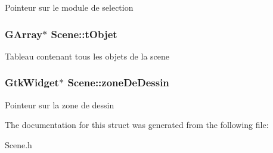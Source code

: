 \label{structScene_aeb68132316fb6167b13ec0fc6419e792}
Pointeur sur le module de selection \hypertarget{structScene_a7737f3a0d0e78060f899485d4d40b3b2}{
\subsubsection[{tObjet}]{\setlength{\rightskip}{0pt plus 5cm}GArray$\ast$ {\bf Scene::tObjet}}}
\label{structScene_a7737f3a0d0e78060f899485d4d40b3b2}
Tableau contenant tous les objets de la scene \hypertarget{structScene_a606000d1232ab19bb20c81ade829f8f8}{
\subsubsection[{zoneDeDessin}]{\setlength{\rightskip}{0pt plus 5cm}GtkWidget$\ast$ {\bf Scene::zoneDeDessin}}}
\label{structScene_a606000d1232ab19bb20c81ade829f8f8}
Pointeur sur la zone de dessin 

The documentation for this struct was generated from the following file:\begin{DoxyCompactItemize}
\item 
Scene.h\end{DoxyCompactItemize}
